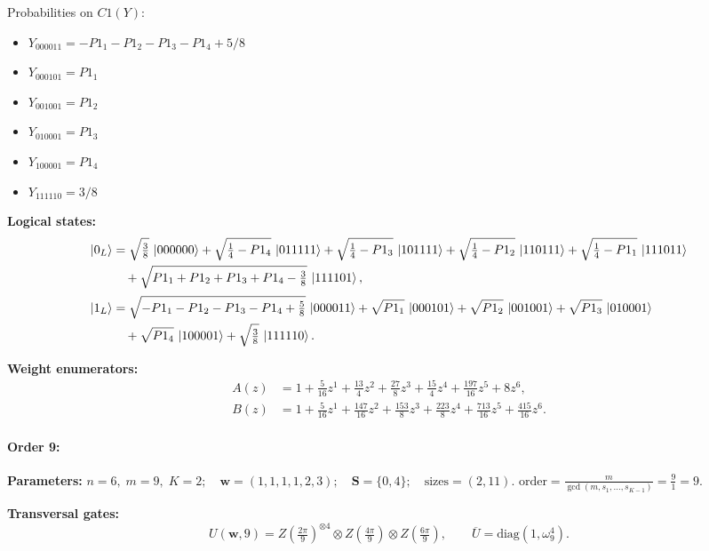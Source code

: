 \documentclass[11pt]{article}
\begin{document}
Probabilities on $C1 (Y)$:
\begin{itemize}
    \item $Y_{000011} = -P1_1 - P1_2 - P1_3 - P1_4 + 5/8$
    \item $Y_{000101} = P1_1$
    \item $Y_{001001} = P1_2$
    \item $Y_{010001} = P1_3$
    \item $Y_{100001} = P1_4$
    \item $Y_{111110} = 3/8$
\end{itemize}

\noindent\textbf{Logical states:}
\begin{align*}
\ket{0_L} &= \sqrt{\tfrac{3}{8}}\,\ket{000000} + \sqrt{\tfrac{1}{4} - P1_4}\,\ket{011111} + \sqrt{\tfrac{1}{4} - P1_3}\,\ket{101111} + \sqrt{\tfrac{1}{4} - P1_2}\,\ket{110111} + \sqrt{\tfrac{1}{4} - P1_1}\,\ket{111011}\\
&\quad + \sqrt{P1_1 + P1_2 + P1_3 + P1_4 - \tfrac{3}{8}}\,\ket{111101},
\\[2pt]
\ket{1_L} &= \sqrt{-P1_1 - P1_2 - P1_3 - P1_4 + \tfrac{5}{8}}\,\ket{000011} + \sqrt{P1_1}\,\ket{000101} + \sqrt{P1_2}\,\ket{001001} + \sqrt{P1_3}\,\ket{010001}\\
&\quad + \sqrt{P1_4}\,\ket{100001} + \sqrt{\tfrac{3}{8}}\,\ket{111110}.
\end{align*}

\noindent\textbf{Weight enumerators:}
\begin{align*}
A(z) &= 1 + \tfrac{5}{16}z^{1} + \tfrac{13}{4}z^{2} + \tfrac{27}{8}z^{3} + \tfrac{15}{4}z^{4} + \tfrac{197}{16}z^{5} + 8z^{6},\\[2pt]
B(z) &= 1 + \tfrac{5}{16}z^{1} + \tfrac{147}{16}z^{2} + \tfrac{153}{8}z^{3} + \tfrac{223}{8}z^{4} + \tfrac{713}{16}z^{5} + \tfrac{415}{16}z^{6}.
\end{align*}

\paragraph{\textbf{Order 9:}}
\noindent\textbf{Parameters:} $n=6,\; m=9,\; K=2;\quad \mathbf w=(1, 1, 1, 1, 2, 3);\quad \mathbf S=\{0, 4\};\quad \text{sizes}=\left(2, 11\right).$ $\displaystyle \text{order}=\frac{m}{\gcd(m,s_1,\dots,s_{K-1})}=\frac{9}{1}=9.$

\noindent\textbf{Transversal gates:}
\[
    U(\mathbf w,9)=Z \left(\tfrac{2\pi}{9}\right)^{\otimes4} \otimes Z \left(\tfrac{4\pi}{9}\right) \otimes Z \left(\tfrac{6\pi}{9}\right),\qquad
    \overline U=\mathrm{diag}(1,\omega_{9}^{4}).
\]
\end{document}
